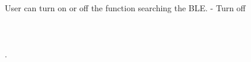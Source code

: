 \documentclass[conference]{IEEEtran}
\begin{document}
User can turn on or off the function searching the BLE. - Turn off\\\\\\\\
.
%
%



%
%
\end{document}
